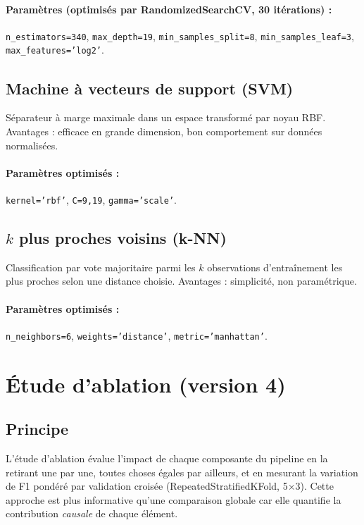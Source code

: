 \documentclass[12pt,a4paper]{article}
\begin{document}
\paragraph{Paramètres (optimisés par RandomizedSearchCV, 30 itérations) :}
\texttt{n\_estimators=340}, \texttt{max\_depth=19}, \texttt{min\_samples\_split=8},
\texttt{min\_samples\_leaf=3}, \texttt{max\_features='log2'}.

\subsection{Machine à vecteurs de support (SVM)}

Séparateur à marge maximale dans un espace transformé par noyau RBF.
Avantages : efficace en grande dimension, bon comportement sur données
normalisées.

\paragraph{Paramètres optimisés :}
\texttt{kernel='rbf'}, \texttt{C=9,19}, \texttt{gamma='scale'}.

\subsection{$k$ plus proches voisins (k-NN)}

Classification par vote majoritaire parmi les $k$ observations d'entraînement
les plus proches selon une distance choisie.
Avantages : simplicité, non paramétrique.

\paragraph{Paramètres optimisés :}
\texttt{n\_neighbors=6}, \texttt{weights='distance'},
\texttt{metric='manhattan'}.

\section{Étude d'ablation (version 4)}

\subsection{Principe}

L'étude d'ablation évalue l'impact de chaque composante du pipeline en la
retirant une par une, toutes choses égales par ailleurs, et en mesurant la
variation de F1 pondéré par validation croisée (RepeatedStratifiedKFold,
5$\times$3). Cette approche est plus informative qu'une comparaison globale
car elle quantifie la contribution \emph{causale} de chaque élément.
\end{document}
